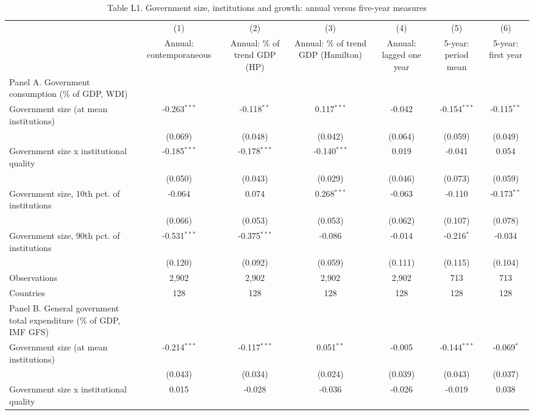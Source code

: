 \begin{table}[htbp]\centering\footnotesize
\providecommand{\sym}[1]{\ensuremath{^{#1}}}
\caption{Table L1. Government size, institutions and growth: annual versus five-year measures}\label{tab:TableL1_frequency_institutions}
\begin{tabular}{l*{6}{c}}
\toprule
 & (1) & (2) & (3) & (4) & (5) & (6) \\
 & Annual: contemporaneous & Annual: \% of trend GDP (HP) & Annual: \% of trend GDP (Hamilton) & Annual: lagged one year & 5-year: period mean & 5-year: first year \\
\midrule
Panel A. Government consumption (\% of GDP, WDI) &  &  &  &  &  &  \\
Government size (at mean institutions) & -0.263\sym{***} & -0.118\sym{**} & 0.117\sym{***} & -0.042 & -0.154\sym{***} & -0.115\sym{**} \\
 & (0.069) & (0.048) & (0.042) & (0.064) & (0.059) & (0.049) \\
Government size x institutional quality & -0.185\sym{***} & -0.178\sym{***} & -0.140\sym{***} & 0.019 & -0.041 & 0.054 \\
 & (0.050) & (0.043) & (0.029) & (0.046) & (0.073) & (0.059) \\
Government size, 10th pct. of institutions & -0.064 & 0.074 & 0.268\sym{***} & -0.063 & -0.110 & -0.173\sym{**} \\
 & (0.066) & (0.053) & (0.053) & (0.062) & (0.107) & (0.078) \\
Government size, 90th pct. of institutions & -0.531\sym{***} & -0.375\sym{***} & -0.086 & -0.014 & -0.216\sym{*} & -0.034 \\
 & (0.120) & (0.092) & (0.059) & (0.111) & (0.115) & (0.104) \\
Observations & 2,902 & 2,902 & 2,902 & 2,902 & 713 & 713 \\
Countries & 128 & 128 & 128 & 128 & 128 & 128 \\
\midrule
Panel B. General government total expenditure (\% of GDP, IMF GFS) &  &  &  &  &  &  \\
Government size (at mean institutions) & -0.214\sym{***} & -0.117\sym{***} & 0.051\sym{**} & -0.005 & -0.144\sym{***} & -0.069\sym{*} \\
 & (0.043) & (0.034) & (0.024) & (0.039) & (0.043) & (0.037) \\
Government size x institutional quality & 0.015 & -0.028 & -0.036 & -0.026 & -0.019 & 0.038 \\

\end{tabular}
\end{table}
